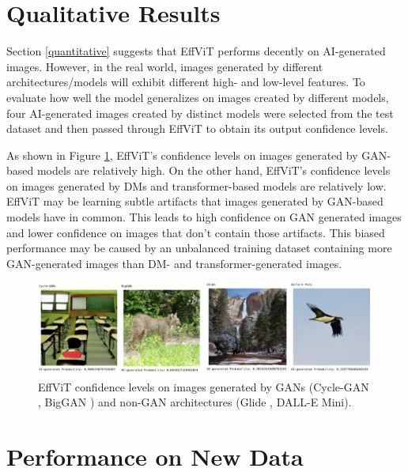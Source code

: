 \documentclass{article} %
\begin{document}
\section{Qualitative Results}

Section \ref{quantitative} suggests that EffViT performs decently on AI-generated images. However, in the real world, images generated by different architectures/models will exhibit different high- and low-level features. To evaluate how well the model generalizes on images created by different models, four AI-generated images created by distinct models were selected from the test dataset and then passed through EffViT to obtain its output confidence levels.

As shown in Figure \ref{fig:Conf}, EffViT's confidence levels on images generated by GAN-based models are relatively high. On the other hand, EffViT's confidence levels on images generated by DMs and transformer-based models are relatively low. EffViT may be learning subtle artifacts that images generated by GAN-based models have in common. This leads to high confidence on GAN generated images and lower confidence on images that don't contain those artifacts. This biased performance may be caused by an unbalanced training dataset containing more GAN-generated images than DM- and transformer-generated images.

\begin{figure}[h]
    \begin{center}
        \includegraphics[scale=0.45]{figs/Confidence shrinked.png}
    \end{center}
    \caption{EffViT confidence levels on images generated by GANs (Cycle-GAN \citep{zhu2020unpairedimagetoimagetranslationusing}, BigGAN \citep{brock2019largescalegantraining}) and non-GAN architectures (Glide \citep{nichol2022glidephotorealisticimagegeneration}, DALL-E Mini).}
    \label{fig:Conf}
\end{figure}


\section{Performance on New Data}
\end{document}
